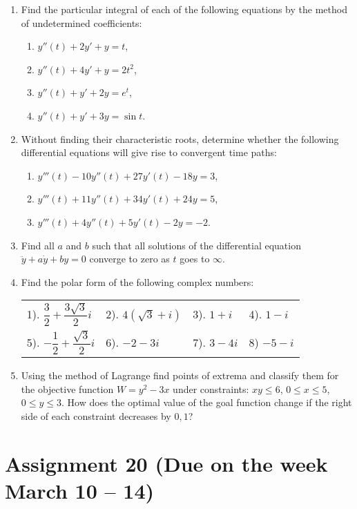 \documentclass[12pt]{article} %
\theoremstyle{definition} %
\begin{document}
\begin{enumerate}
\item Find the particular integral of each of the following equations by the method of undetermined coefficients:

\begin{enumerate}
\item $y''(t)+2y'+y=t$,
\item $y''(t)+4y'+y=2t^2$,
\item $y''(t)+y'+2y=e^t$,
\item $y''(t)+y'+3y=\sin t$.
\end{enumerate}

\item Without finding their characteristic roots, determine whether the following differential equations will give rise to convergent time paths:
\begin{enumerate}
\item $y'''(t)-10y''(t)+27 y'(t)-18y=3$,
\item $y'''(t)+11y''(t)+34 y'(t)+24 y=5$,
\item $y'''(t)+4y''(t)+5y'(t)-2y=-2$.
\end{enumerate}

\item Find all $a$ and $b$ such that all solutions of the differential equation $\ddot{y}+a\dot{y}+by=0$ converge to zero as $t$ goes to $\infty$.

\item Find the polar form of the following complex numbers:

\begin{tabular}{llll}
1). $\dfrac32+\dfrac{3\sqrt{3}}2i$ & 2). $4(\sqrt{3}+i)$ & 3). $1+i$ & 4). $1-i$\\
5). $-\dfrac12+\dfrac {\sqrt{3}}2i$ & 6). $-2-3i$ & 7). $3-4i$ & 8) $-5-i$\\
\end{tabular}

\item Using the method of Lagrange find points of extrema and classify them for the objective function $W=y^2-3x$ under constraints: $xy\leq 6$, $0\leq x\leq 5$, $0\leq y\leq 3$. How does the optimal value of the goal function change if the right side of each constraint decreases by $0,1$?
\end{enumerate}




\section*{Assignment 20 (Due on the week March 10 – 14)}
\end{document}
